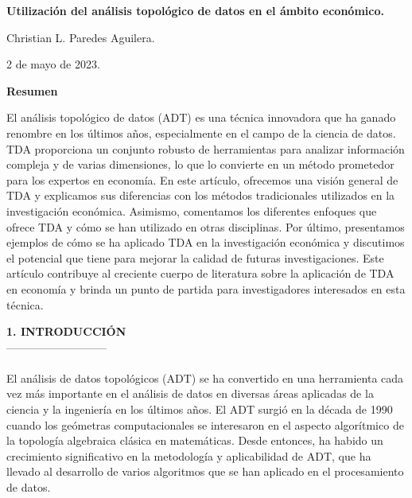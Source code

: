 \begin{center}
    \Large \textbf{Utilización del análisis topológico de datos en el ámbito económico.} 
\end{center}

\begin{center}
    \normalsize Christian L. Paredes Aguilera.
\end{center}

\begin{center}
    2 de mayo de 2023.
\end{center}

\vspace{1.5cm}

\begin{center}
    \textbf{Resumen}
\end{center}

\begin{tcolorbox}
    El análisis topológico de datos (ADT) es una técnica innovadora que ha ganado renombre en los últimos años, especialmente en el campo de la ciencia de datos. TDA proporciona un conjunto robusto de herramientas para analizar información compleja y de varias dimensiones, lo que lo convierte en un método prometedor para los expertos en economía. En este artículo, ofrecemos una visión general de TDA y explicamos sus diferencias con los métodos tradicionales utilizados en la investigación económica. Asimismo, comentamos los diferentes enfoques que ofrece TDA y cómo se han utilizado en otras disciplinas. Por último, presentamos ejemplos de cómo se ha aplicado TDA en la investigación económica y discutimos el potencial que tiene para mejorar la calidad de futuras investigaciones. Este artículo contribuye al creciente cuerpo de literatura sobre la aplicación de TDA en economía y brinda un punto de partida para investigadores interesados en esta técnica.
\end{tcolorbox}

\vspace{1.5cm}

\textbf{1. INTRODUCCIÓN}\\
---------------------------\\\\
El análisis de datos topológicos (ADT) se ha convertido en una herramienta cada vez más importante en el análisis de datos en diversas áreas aplicadas de la ciencia y la ingeniería en los últimos años. El ADT surgió en la década de 1990 cuando los geómetras computacionales se interesaron en el aspecto algorítmico de la topología algebraica clásica en matemáticas. Desde entonces, ha habido un crecimiento significativo en la metodología y aplicabilidad de ADT, que ha llevado al desarrollo de varios algoritmos que se han aplicado en el procesamiento de datos.

